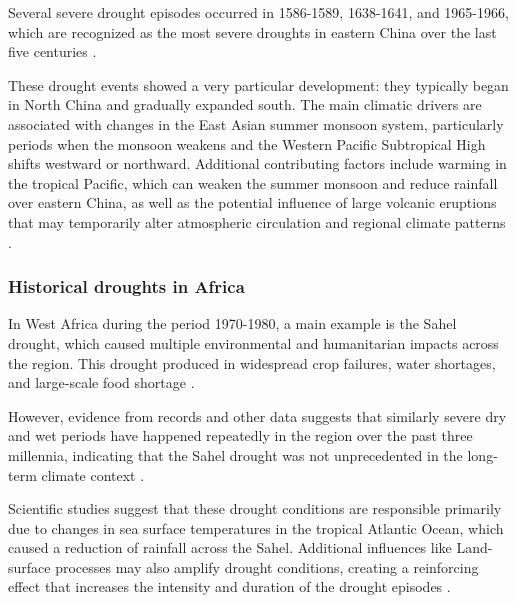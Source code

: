 \documentclass{article}
\begin{document}
Several severe drought episodes occurred in 1586-1589, 1638-1641, and 1965-1966, which are recognized as the most severe droughts in eastern China over the last five centuries \parencite{Shen2007ExceptionalDrought}.

These drought events showed a very particular development: they typically began in North China and gradually expanded south. The main climatic drivers are associated with changes in the East Asian summer monsoon system, particularly periods when the monsoon weakens and the Western Pacific Subtropical High shifts westward or northward. Additional contributing factors include warming in the tropical Pacific, which can weaken the summer monsoon and reduce rainfall over eastern China, as well as the potential influence of large volcanic eruptions that may temporarily alter atmospheric circulation and regional climate patterns \parencite{douville2021water}.

\subsubsection*{Historical droughts in Africa}

In West Africa during the period 1970-1980, a main example is the Sahel drought,  which caused multiple environmental and humanitarian impacts across the region. This  drought produced in widespread crop failures, water shortages, and large-scale food shortage \parencite{wcc, douville2021water}.

However, evidence from  records and other data suggests that similarly severe dry and wet periods have happened repeatedly in the region over the past three millennia, indicating that the Sahel drought was not unprecedented in the long-term climate context \parencite{aridity}.

Scientific studies suggest that these drought conditions are responsible primarily due to changes in sea surface temperatures in the tropical Atlantic Ocean, which caused a reduction of rainfall across the Sahel. Additional influences like Land-surface processes may also amplify drought conditions, creating a reinforcing effect that increases the intensity and duration of the drought episodes \parencite{wcc, douville2021water}.
\end{document}
